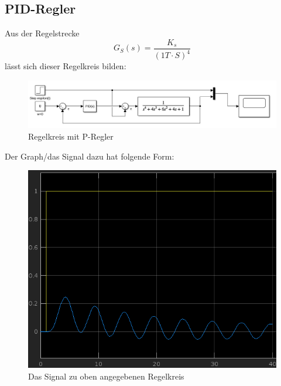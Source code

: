 \documentclass{article}
\begin{document}
		\subsection{PID-Regler}
			Aus der Regelstrecke 
			$$G_S(s) = \frac{K_s}{(1 T\cdot S)^4}$$
			lässt sich dieser Regelkreis bilden:
			\begin{figure}[h]
				\includegraphics[scale=0.5, center]{4_c_Blockschaltbild.png}
				\caption{Regelkreis mit P-Regler}
				\label{fig37: Blockschaltbild_PID_Regler}
			\end{figure}
			Der Graph/das Signal dazu hat folgende Form:
			\begin{figure}[h]
				\includegraphics[scale = 0.5, center]{4_c_Graph.png}
				\caption{Das Signal zu oben angegebenen Regelkreis}
				\label{fig38: 4_c_Graph}
			\end{figure}
\newpage
\end{document}
